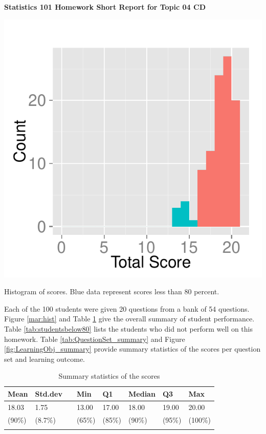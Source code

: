 \documentclass[12pt,english,nohyper]{tufte-handout}\usepackage[]{graphicx}\usepackage[]{color}
\begin{document}
\centerline{\Large\bf Statistics 101 Homework Short Report for Topic 04 CD}
\vspace{1cm}

\begin{marginfigure}
\includegraphics[width=0.98\linewidth]{Topic04_CD_score}
\caption{\label{mar:hist}Histogram of scores. Blue data represent scores less than 80 percent.}
\end{marginfigure}

Each of the 100 students were given 20 questions from a bank of 54 questions. Figure \ref{mar:hist} and Table \ref{tab:summary} give the overall summary of student performance. Table \ref{tab:studentsbelow80} lists the students who did not perform well on this homework. Table \ref{tab:QuestionSet_summary} and Figure \ref{fig:LearningObj_summary} provide summary statistics of the scores per question set and learning outcome.
\bigskip{}

\begin{longtable}{llllllll}
  \hline
Mean & Std.dev &   & Min & Q1 & Median & Q3 & Max \\ 
  \hline
18.03 & 1.75 &  & 13.00 & 17.00 & 18.00 & 19.00 & 20.00 \\ 
  (90\%) & (8.7\%) &  & (65\%) & (85\%) & (90\%) & (95\%) & (100\%) \\ 
   \hline
\hline
\caption{Summary statistics of the scores} 
\label{tab:summary}
\end{longtable}
\end{document}
